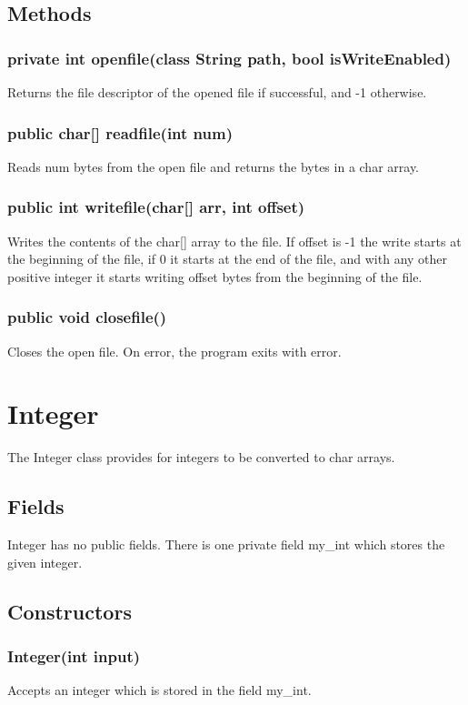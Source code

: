 \begin{homeworkProblem}
	\subsection{Methods}
    \subsubsection{private int openfile(class String path, bool isWriteEnabled)}
    Returns the file descriptor of the opened file if successful, and -1 otherwise. 
	\subsubsection{public char[] readfile(int num)}
	Reads num bytes from the open file and returns the bytes in a char array.
	\subsubsection{public int writefile(char[] arr, int offset)}
	Writes the contents of the char[] array to the file. If offset is -1 the write starts at the beginning of the file, if 0 it starts at the end of the file, and with any other positive integer it starts writing offset bytes from the beginning of the file.
	\subsubsection{public void closefile()}
	Closes the open file. On error, the program exits with error.

    \section{Integer}
    The Integer class provides for integers to be converted to char arrays.
    \subsection{Fields}
    Integer has no public fields. There is one private field my_int which stores the given integer.

    \subsection{Constructors}
    \subsubsection{Integer(int input)}
    Accepts an integer which is stored in the field my_int.


\end{homeworkProblem}
